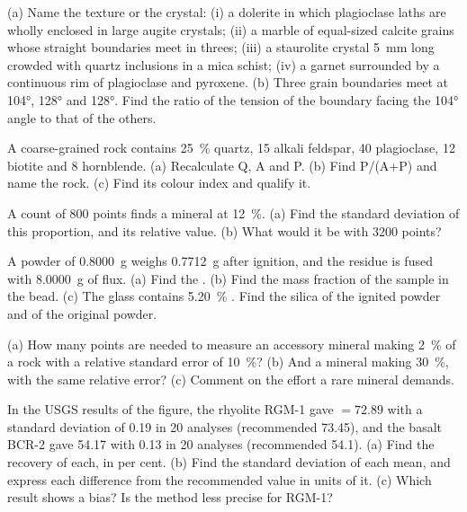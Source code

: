 \begin{exercise}[$\star$]\label{exo:b2:field-lab-methods-2:1}
(a) Name the texture or the crystal: (i) a dolerite in which plagioclase laths are wholly enclosed in
large augite crystals; (ii) a marble of equal-sized calcite grains whose straight boundaries meet in
threes; (iii) a staurolite crystal \qty{5}{mm} long crowded with quartz inclusions in a mica schist;
(iv) a garnet surrounded by a continuous rim of plagioclase and pyroxene. (b) Three grain boundaries
meet at \ang{104}, \ang{128} and \ang{128}. Find the ratio of the tension of the boundary facing
the \ang{104} angle to that of the others.
\end{exercise}

\begin{exercise}[$\star$]\label{exo:b2:field-lab-methods-2:2}
A coarse-grained rock contains \qty{25}{\percent} quartz, 15 alkali feldspar, 40 plagioclase, 12
biotite and 8 hornblende. (a) Recalculate Q, A and P. (b) Find P/(A+P) and name the rock. (c) Find
its colour index and qualify it.
\end{exercise}

\begin{exercise}[$\star$]\label{exo:b2:field-lab-methods-2:3}
A count of 800 points finds a mineral at \qty{12}{\percent}. (a) Find the standard deviation of
this proportion, and its relative value. (b) What would it be with 3200 points?
\end{exercise}

\begin{exercise}[$\star$]\label{exo:b2:field-lab-methods-2:4}
A powder of \qty{0.8000}{g} weighs \qty{0.7712}{g} after ignition, and the residue is fused with
\qty{8.0000}{g} of flux. (a) Find the . (b) Find the mass fraction of the sample in
the bead. (c) The glass contains \qty{5.20}{\percent} . Find the silica of the ignited powder
and of the original powder.
\end{exercise}

\begin{exercise}[$\star\star$]\label{exo:b2:field-lab-methods-2:5}
(a) How many points are needed to measure an accessory mineral making \qty{2}{\percent} of a rock
with a relative standard error of \qty{10}{\percent}? (b) And a mineral making \qty{30}{\percent},
with the same relative error? (c) Comment on the effort a rare mineral demands.
\end{exercise}

\begin{exercise}[$\star\star$]\label{exo:b2:field-lab-methods-2:6}
In the USGS results of the figure, the rhyolite RGM-1 gave  $= 72.89$ with a standard
deviation of 0.19 in 20 analyses (recommended 73.45), and the basalt BCR-2 gave 54.17 with 0.13 in
20 analyses (recommended 54.1). (a) Find the recovery of each, in per cent. (b) Find the standard
deviation of each mean, and express each difference from the recommended value in units of it.
(c) Which result shows a bias? Is the method less precise for RGM-1?
\end{exercise}

